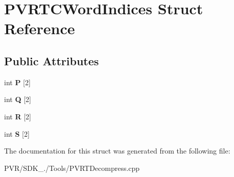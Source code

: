 \hypertarget{struct_p_v_r_t_c_word_indices}{\section{P\+V\+R\+T\+C\+Word\+Indices Struct Reference}
\label{struct_p_v_r_t_c_word_indices}
}
\subsection*{Public Attributes}
\begin{DoxyCompactItemize}
\item 
\hypertarget{struct_p_v_r_t_c_word_indices_a142836ff0f9374b21b14d04fedfc63b9}{int {\bfseries P} \mbox{[}2\mbox{]}}\label{struct_p_v_r_t_c_word_indices_a142836ff0f9374b21b14d04fedfc63b9}

\item 
\hypertarget{struct_p_v_r_t_c_word_indices_a178a799729c472c8662d3ba5af759869}{int {\bfseries Q} \mbox{[}2\mbox{]}}\label{struct_p_v_r_t_c_word_indices_a178a799729c472c8662d3ba5af759869}

\item 
\hypertarget{struct_p_v_r_t_c_word_indices_aaf53aa1083ed69709862209a2a61f466}{int {\bfseries R} \mbox{[}2\mbox{]}}\label{struct_p_v_r_t_c_word_indices_aaf53aa1083ed69709862209a2a61f466}

\item 
\hypertarget{struct_p_v_r_t_c_word_indices_a37770d5f66fdbc1012a547f22eef7444}{int {\bfseries S} \mbox{[}2\mbox{]}}\label{struct_p_v_r_t_c_word_indices_a37770d5f66fdbc1012a547f22eef7444}

\end{DoxyCompactItemize}


The documentation for this struct was generated from the following file\+:\begin{DoxyCompactItemize}
\item 
P\+V\+R/\+S\+D\+K\+\_./\+Tools/P\+V\+R\+T\+Decompress.\+cpp\end{DoxyCompactItemize}
